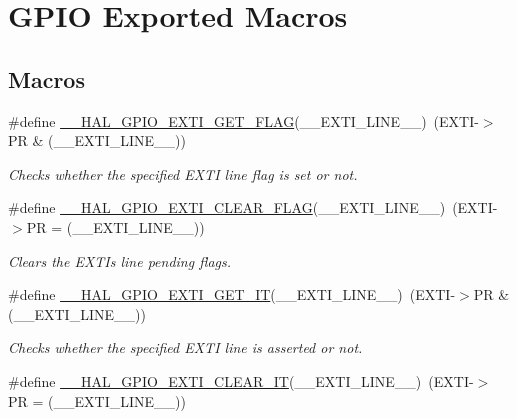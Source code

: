 \hypertarget{group___g_p_i_o___exported___macros}{}\section{G\+P\+IO Exported Macros}
\label{group___g_p_i_o___exported___macros}
\subsection*{Macros}
\begin{DoxyCompactItemize}
\item 
\#define \mbox{\hyperlink{group___g_p_i_o___exported___macros_gaae18fc8d92ffa4df2172c78869e712fc}{\+\_\+\+\_\+\+H\+A\+L\+\_\+\+G\+P\+I\+O\+\_\+\+E\+X\+T\+I\+\_\+\+G\+E\+T\+\_\+\+F\+L\+AG}}(\+\_\+\+\_\+\+E\+X\+T\+I\+\_\+\+L\+I\+N\+E\+\_\+\+\_\+)~(E\+X\+TI-\/$>$PR \& (\+\_\+\+\_\+\+E\+X\+T\+I\+\_\+\+L\+I\+N\+E\+\_\+\+\_\+))
\begin{DoxyCompactList}\small\item\em Checks whether the specified E\+X\+TI line flag is set or not. \end{DoxyCompactList}\item 
\#define \mbox{\hyperlink{group___g_p_i_o___exported___macros_ga2f28fc349d1812cdc55a77c68d2b278d}{\+\_\+\+\_\+\+H\+A\+L\+\_\+\+G\+P\+I\+O\+\_\+\+E\+X\+T\+I\+\_\+\+C\+L\+E\+A\+R\+\_\+\+F\+L\+AG}}(\+\_\+\+\_\+\+E\+X\+T\+I\+\_\+\+L\+I\+N\+E\+\_\+\+\_\+)~(E\+X\+TI-\/$>$PR = (\+\_\+\+\_\+\+E\+X\+T\+I\+\_\+\+L\+I\+N\+E\+\_\+\+\_\+))
\begin{DoxyCompactList}\small\item\em Clears the E\+X\+TI\textquotesingle{}s line pending flags. \end{DoxyCompactList}\item 
\#define \mbox{\hyperlink{group___g_p_i_o___exported___macros_ga27f0e1f6c38745169d74620f6a178a94}{\+\_\+\+\_\+\+H\+A\+L\+\_\+\+G\+P\+I\+O\+\_\+\+E\+X\+T\+I\+\_\+\+G\+E\+T\+\_\+\+IT}}(\+\_\+\+\_\+\+E\+X\+T\+I\+\_\+\+L\+I\+N\+E\+\_\+\+\_\+)~(E\+X\+TI-\/$>$PR \& (\+\_\+\+\_\+\+E\+X\+T\+I\+\_\+\+L\+I\+N\+E\+\_\+\+\_\+))
\begin{DoxyCompactList}\small\item\em Checks whether the specified E\+X\+TI line is asserted or not. \end{DoxyCompactList}\item 
\#define \mbox{\hyperlink{group___g_p_i_o___exported___macros_ga2a086506eec826f49b200fba64beb9f1}{\+\_\+\+\_\+\+H\+A\+L\+\_\+\+G\+P\+I\+O\+\_\+\+E\+X\+T\+I\+\_\+\+C\+L\+E\+A\+R\+\_\+\+IT}}(\+\_\+\+\_\+\+E\+X\+T\+I\+\_\+\+L\+I\+N\+E\+\_\+\+\_\+)~(E\+X\+TI-\/$>$PR = (\+\_\+\+\_\+\+E\+X\+T\+I\+\_\+\+L\+I\+N\+E\+\_\+\+\_\+))

\end{DoxyCompactItemize}
